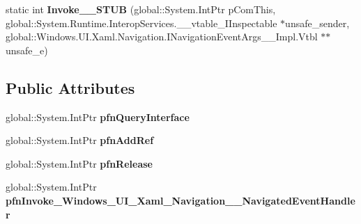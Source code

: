 \begin{DoxyCompactItemize}
\item 
\mbox{\label{struct_windows_1_1_u_i_1_1_xaml_1_1_navigation_1_1_navigated_event_handler_____impl_1_1_vtbl_a74f0a52eddf047aefe405f2f3949a636}} 
static int {\bfseries Invoke\+\_\+\+\_\+\+S\+T\+UB} (global\+::\+System.\+Int\+Ptr p\+Com\+This, global\+::\+System.\+Runtime.\+Interop\+Services.\+\_\+\+\_\+vtable\+\_\+\+I\+Inspectable $\ast$unsafe\+\_\+sender, global\+::\+Windows.\+U\+I.\+Xaml.\+Navigation.\+I\+Navigation\+Event\+Args\+\_\+\+\_\+\+Impl.\+Vtbl $\ast$$\ast$unsafe\+\_\+e)
\end{DoxyCompactItemize}
\subsection*{Public Attributes}
\begin{DoxyCompactItemize}
\item 
\mbox{\label{struct_windows_1_1_u_i_1_1_xaml_1_1_navigation_1_1_navigated_event_handler_____impl_1_1_vtbl_a4b55d1ca0b1a20db26fee3377bb9bd1c}} 
global\+::\+System.\+Int\+Ptr {\bfseries pfn\+Query\+Interface}
\item 
\mbox{\label{struct_windows_1_1_u_i_1_1_xaml_1_1_navigation_1_1_navigated_event_handler_____impl_1_1_vtbl_a85973a91ac14b1a8544d886368271fca}} 
global\+::\+System.\+Int\+Ptr {\bfseries pfn\+Add\+Ref}
\item 
\mbox{\label{struct_windows_1_1_u_i_1_1_xaml_1_1_navigation_1_1_navigated_event_handler_____impl_1_1_vtbl_a7ff00b0281fc1804b3d85d8dbcc0db6b}} 
global\+::\+System.\+Int\+Ptr {\bfseries pfn\+Release}
\item 
\mbox{\label{struct_windows_1_1_u_i_1_1_xaml_1_1_navigation_1_1_navigated_event_handler_____impl_1_1_vtbl_aac98d3cbdf387e085fd2d9d7cff84673}} 
global\+::\+System.\+Int\+Ptr {\bfseries pfn\+Invoke\+\_\+\+Windows\+\_\+\+U\+I\+\_\+\+Xaml\+\_\+\+Navigation\+\_\+\+\_\+\+Navigated\+Event\+Handler}
\end{DoxyCompactItemize}
